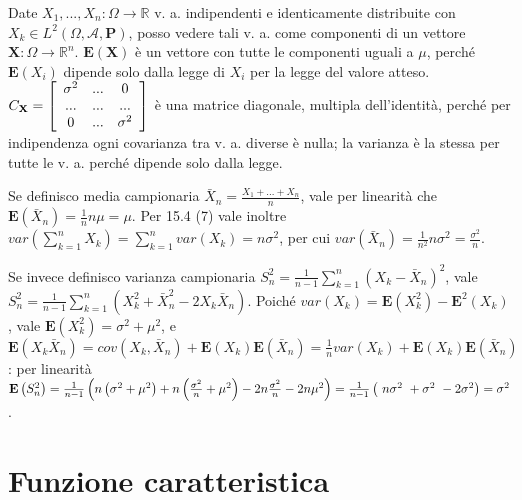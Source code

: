 \documentclass{article}
\begin{document}
Date $X_{1},...,X_{n}:\Omega \rightarrow 
\mathbb{R}
$ v. a. indipendenti e identicamente distribuite con $X_{k}\in L^{2}\left(
\Omega ,\mathcal{A},\mathbf{P}\right) $, posso vedere tali v. a. come
componenti di un vettore $\mathbf{X}:\Omega \rightarrow 
\mathbb{R}
^{n}$. $\mathbf{E}\left( \mathbf{X}\right) $ \`{e} un vettore con tutte le
componenti uguali a $\mu $, perch\'{e} $\mathbf{E}\left( X_{i}\right) $
dipende solo dalla legge di $X_{i}$ per la legge del valore atteso. $C_{%
\mathbf{X}}=\left[ 
\begin{array}{ccc}
\sigma ^{2} & ... & 0 \\ 
... & ... & ... \\ 
0 & ... & \sigma ^{2}%
\end{array}%
\right] $ \`{e} una matrice diagonale, multipla dell'identit\`{a}, perch\'{e}
per indipendenza ogni covarianza tra v. a. diverse \`{e} nulla; la varianza 
\`{e} la stessa per tutte le v. a. perch\'{e} dipende solo dalla legge.

Se definisco media campionaria $\bar{X}_{n}=\frac{X_{1}+...+X_{n}}{n}$, vale
per linearit\`{a} che $\mathbf{E}\left( \bar{X}_{n}\right) =\frac{1}{n}n\mu
=\mu $. Per 15.4 (7) vale inoltre $var\left( \sum_{k=1}^{n}X_{k}\right)
=\sum_{k=1}^{n}var\left( X_{k}\right) =n\sigma ^{2}$, per cui $var\left( 
\bar{X}_{n}\right) =\frac{1}{n^{2}}n\sigma ^{2}=\frac{\sigma ^{2}}{n}$.

Se invece definisco varianza campionaria $S_{n}^{2}=\frac{1}{n-1}%
\sum_{k=1}^{n}\left( X_{k}-\bar{X}_{n}\right) ^{2}$, vale $S_{n}^{2}=\frac{1%
}{n-1}\sum_{k=1}^{n}\left( X_{k}^{2}+\bar{X}_{n}^{2}-2X_{k}\bar{X}%
_{n}\right) $. Poich\'{e} $var\left( X_{k}\right) =\mathbf{E}\left(
X_{k}^{2}\right) -\mathbf{E}^{2}\left( X_{k}\right) $, vale $\mathbf{E}%
\left( X_{k}^{2}\right) =\sigma ^{2}+\mu ^{2}$, e $\mathbf{E}\left( X_{k}%
\bar{X}_{n}\right) =cov\left( X_{k},\bar{X}_{n}\right) +\mathbf{E}\left(
X_{k}\right) \mathbf{E}\left( \bar{X}_{n}\right) =\frac{1}{n}var\left(
X_{k}\right) +\mathbf{E}\left( X_{k}\right) \mathbf{E}\left( \bar{X}%
_{n}\right) $: per linearit\`{a} $\mathbf{E}\left( S_{n}^{2}\right) =\frac{1%
}{n-1}\left( n\left( \sigma ^{2}+\mu ^{2}\right) +n\left( \frac{\sigma ^{2}}{%
n}+\mu ^{2}\right) -2n\frac{\sigma ^{2}}{n}-2n\mu ^{2}\right) =\frac{1}{n-1}%
\left( \ n\sigma ^{2}\ +\sigma ^{2}\ -2\sigma ^{2}\right) =\sigma ^{2}$.

\section{Funzione caratteristica}
\end{document}
